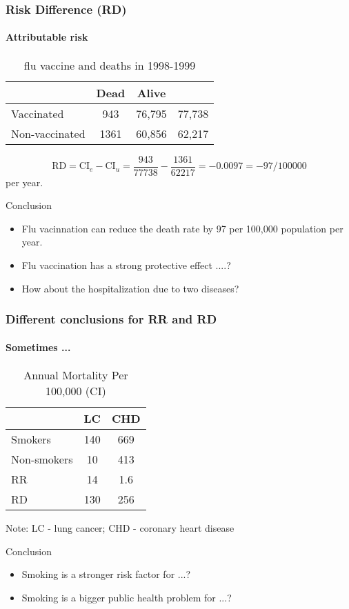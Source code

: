 \documentclass[table,10pt]{beamer}
\begin{document}
\begin{CJK*}{UTF8}{gbsn}
\begin{frame}[t]
\frametitle{Risk Difference (RD)}
\framesubtitle{Attributable risk}
\begin{table}
\renewcommand\arraystretch{1.2}
\small
\caption{flu vaccine and deaths in 1998-1999}
\begin{tabular}{lccc}
\hline
 & Dead & Alive & \\
\hline
Vaccinated & 943 & 76,795 & 77,738\\
Non-vaccinated & 1361 & 60,856 & 62,217\\
\hline
\end{tabular}
\end{table}
$$\textrm{RD} = \textrm{CI}_e - \textrm{CI}_u = \frac{943}{77738} - \frac{1361}{62217} = -0.0097 = -97/100000$$ per year.
\begin{alertblock}{\center Conclusion}
\begin{itemize}
	\item Flu vacinnation can reduce the death rate by 97 per 100,000 population per year.
	\item Flu vaccination has a strong protective effect ....?  
	\item How about the hospitalization due to two diseases?
\end{itemize}
\end{alertblock}
\end{frame}

\begin{frame}[t]
\frametitle{Different conclusions for RR and RD}
\framesubtitle{Sometimes ...}
\begin{table}
\caption{Annual Mortality Per 100,000 (CI)}
\begin{tabular}{p{3cm}cc}
\hline
 & LC & CHD\\
\hline
Smokers & 140 & 669\\
Non-smokers & 10 & 413\\
\hline
RR & 14 & 1.6\\
RD & 130 & 256\\
\hline
\end{tabular}
\end{table}
\center\alert{Note: LC - lung cancer; CHD - coronary heart disease}
\begin{alertblock}{\center Conclusion}
\begin{itemize}
	\item Smoking is a stronger risk factor for ...?
	\item Smoking is a bigger public health problem for ...?
\end{itemize}
\end{alertblock}
\end{frame}



\end{CJK*}
\end{document}
